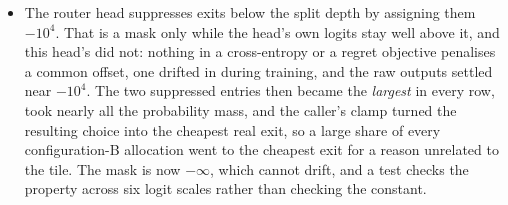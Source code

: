 \begin{itemize}
      bug; a source test now asserts that every script using
      \texttt{torch.cuda.Event} pins the device first, and it found two more.
\item The router head suppresses exits below the split depth by assigning them
      $-10^{4}$. That is a mask only while the head's own logits stay well above
      it, and this head's did not: nothing in a cross-entropy or a regret
      objective penalises a common offset, one drifted in during training, and
      the raw outputs settled near $-10^{4}$. The two suppressed entries then
      became the \emph{largest} in every row, took nearly all the probability
      mass, and the caller's clamp turned the resulting choice into the cheapest
      real exit, so a large share of every configuration-B allocation went to
      the cheapest exit for a reason unrelated to the tile. The mask is now
      $-\infty$, which cannot drift, and a test checks the property across six
      logit scales rather than checking the constant.
\end{itemize}
